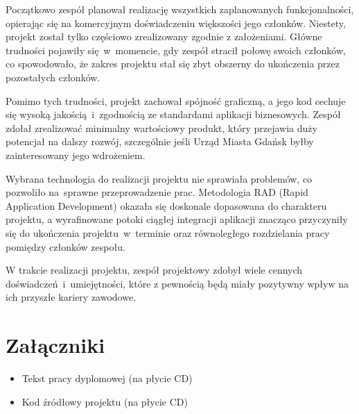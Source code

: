 Początkowo zespół planował realizację wszystkich zaplanowanych funkcjonalności, opierając się na komercyjnym doświadczeniu większości jego członków.
Niestety, projekt został tylko częściowo zrealizowany zgodnie z założeniami.
Główne trudności pojawiły się~w~momencie, gdy zespół stracił połowę swoich członków, co spowodowało, że zakres projektu stał się zbyt obszerny do ukończenia przez pozostałych członków.

Pomimo tych trudności, projekt zachował spójność graficzną, a jego kod cechuje się wysoką jakością~i~zgodnością ze standardami aplikacji biznesowych.
Zespół zdołał zrealizować minimalny wartościowy produkt, który przejawia duży potencjał na dalszy rozwój, szczególnie jeśli Urząd Miasta Gdańsk byłby zainteresowany jego wdrożeniem.

Wybrana technologia do realizacji projektu nie sprawiała problemów, co pozwoliło na~sprawne przeprowadzenie prac.
Metodologia RAD (Rapid Application Development) okazała się doskonale dopasowana do charakteru projektu, a wyrafinowane potoki ciągłej integracji aplikacji znacząco przyczyniły się do ukończenia projektu~w~terminie oraz równoległego rozdzielania pracy pomiędzy członków zespołu.

W trakcie realizacji projektu, zespół projektowy zdobył wiele cennych doświadczeń~i~umiejętności, które z pewnością będą miały pozytywny wpływ na ich przyszłe kariery zawodowe.

\chapter*{Załączniki}
\begin{itemize}
    \item Tekst pracy dyplomowej (na płycie CD)
    \item Kod źródłowy projektu (na płycie CD)
\end{itemize}
